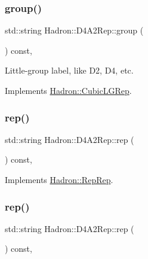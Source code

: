 \subsubsection{\texorpdfstring{group()}{group()}\hspace{0.1cm}{\footnotesize\ttfamily [3/3]}}
{\footnotesize\ttfamily std\+::string Hadron\+::\+D4\+A2\+Rep\+::group (\begin{DoxyParamCaption}{ }\end{DoxyParamCaption}) const\hspace{0.3cm}{\ttfamily [inline]}, {\ttfamily [virtual]}}

Little-\/group label, like D2, D4, etc. 

Implements \mbox{\hyperlink{structHadron_1_1CubicLGRep_a9bdb14b519a611d21379ed96a3a9eb41}{Hadron\+::\+Cubic\+L\+G\+Rep}}.

\mbox{\label{structHadron_1_1D4A2Rep_aa51ab214e55a5545100ab53399ceb137}} 
\subsubsection{\texorpdfstring{rep()}{rep()}\hspace{0.1cm}{\footnotesize\ttfamily [1/3]}}
{\footnotesize\ttfamily std\+::string Hadron\+::\+D4\+A2\+Rep\+::rep (\begin{DoxyParamCaption}{ }\end{DoxyParamCaption}) const\hspace{0.3cm}{\ttfamily [inline]}, {\ttfamily [virtual]}}



Implements \mbox{\hyperlink{structHadron_1_1RepRep_ab3213025f6de249f7095892109575fde}{Hadron\+::\+Rep\+Rep}}.

\mbox{\label{structHadron_1_1D4A2Rep_aa51ab214e55a5545100ab53399ceb137}} 
\subsubsection{\texorpdfstring{rep()}{rep()}\hspace{0.1cm}{\footnotesize\ttfamily [2/3]}}
{\footnotesize\ttfamily std\+::string Hadron\+::\+D4\+A2\+Rep\+::rep (\begin{DoxyParamCaption}{ }\end{DoxyParamCaption}) const\hspace{0.3cm}{\ttfamily [inline]}, {\ttfamily [virtual]}}



